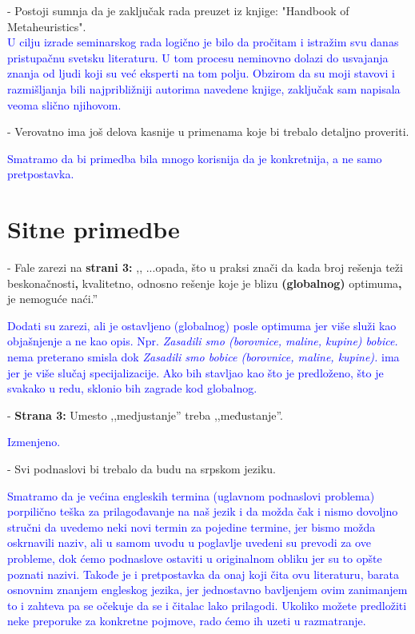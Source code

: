\documentclass[a4paper]{report}
\newcommand{\odgovor}[1]{\textcolor{blue}{#1}}
\begin{document}
- Postoji sumnja da je zaključak rada preuzet iz knjige: "Handbook of Metaheuristics".\\
\odgovor{
U cilju izrade seminarskog rada logično je bilo da pročitam i istražim svu danas pristupačnu svetsku literaturu. U tom procesu neminovno dolazi do usvajanja znanja od ljudi koji su već eksperti na tom polju. Obzirom da su moji stavovi i razmišljanja bili najpribližniji autorima navedene knjige, zaključak sam napisala veoma slično njihovom. \\}

- Verovatno ima još delova kasnije u primenama koje bi trebalo detaljno proveriti.

\odgovor{Smatramo da bi primedba bila mnogo korisnija da je konkretnija, a ne samo pretpostavka.\\}

\section{Sitne primedbe}
- Fale zarezi na \textbf{strani 3:} ,, ...opada, što u praksi znači da kada broj rešenja teži beskonačnosti\textbf{,} kvalitetno, odnosno rešenje koje
je blizu \textbf{(globalnog)} optimuma\textbf{,} je nemoguće naći.''

\odgovor{Dodati su zarezi, ali je ostavljeno (globalnog) posle optimuma jer više služi kao objašnjenje a ne kao opis. Npr. \textit{Zasadili smo (borovnice, maline, kupine) bobice.} nema preterano smisla dok 
\textit{Zasadili smo bobice (borovnice, maline, kupine).} ima jer je više slučaj specijalizacije. Ako bih stavljao kao što je predloženo, što je svakako u redu, sklonio bih zagrade kod globalnog.\\}

- \textbf{Strana 3:} Umesto ,,medjustanje'' treba ,,međustanje''.

\odgovor{Izmenjeno.\\}

- Svi podnaslovi bi trebalo da budu na srpskom jeziku.


\odgovor{Smatramo da je većina engleskih termina (uglavnom podnaslovi problema) porpilično teška za prilagođavanje na naš jezik i da možda čak i nismo dovoljno stručni da uvedemo neki novi termin za pojedine termine, jer bismo možda oskrnavili naziv, ali u samom uvodu u poglavlje uvedeni su prevodi za ove probleme, dok ćemo podnaslove ostaviti u originalnom obliku jer su to opšte poznati nazivi. Takođe je i pretpostavka da onaj koji čita ovu literaturu, barata osnovnim znanjem engleskog jezika, jer jednostavno bavljenjem ovim zanimanjem to i zahteva pa se očekuje da se i čitalac lako prilagodi. Ukoliko možete predložiti neke preporuke za konkretne pojmove, rado ćemo ih uzeti u razmatranje.\\}
\end{document}
